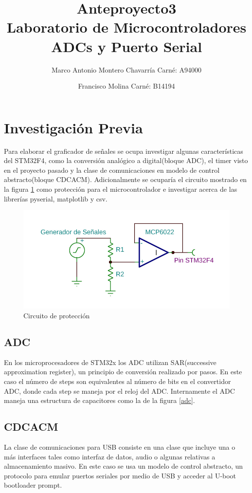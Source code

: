 \documentclass[letterpaper]{article}
\begin{document}
\title{Anteproyecto3\\ Laboratorio de Microcontroladores ADCs y Puerto Serial}
\author{
 Marco Antonio Montero Chavarría Carné: A94000\\
  \and
  Francisco Molina Carné: B14194\\  
}
\maketitle

\section{Investigación Previa}
Para elaborar el graficador de señales se ocupa investigar algunas características del STM32F4, como la conversión analógico a digital(bloque ADC), el timer visto en el proyecto pasado y la clase de comunicaciones en modelo de control abstracto(bloque CDCACM). Adicionalmente se ocuparía el circuito mostrado en la figura \ref{circ1} como protección para el microcontrolador e investigar acerca de las librerías pyserial, matplotlib y csv.
\begin{figure}[hbtp]
\centering
\includegraphics[width=12 cm]{circ1.png}
\caption{Circuito de protección}
\label{circ1}
\end{figure}

\newpage
\subsection{ADC}
En los microprocesadores de STM32x los ADC utilizan SAR(successive approximation register), un principio de conversión realizado por pasos. En este caso el número de steps son equivalentes al número de bits en el convertidor ADC, donde cada step se maneja por el reloj del ADC. Internamente el ADC maneja una estructura de capacitores  como la de la figura \ref{adc}. \cite{adcref}
\subsection{CDCACM}
La clase de comunicaciones para USB consiste en una clase que incluye una o más interfaces tales como interfaz de datos, audio o algunas relativas a almacenamiento masivo.\cite{wikicdc} En este caso se usa un modelo de control abstracto, un protocolo para emular puertos seriales por medio de USB y acceder al U-boot bootloader prompt.\cite{acmwiki} 
\end{document}

